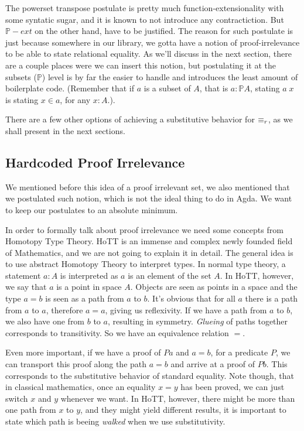 
The powerset transpose postulate is pretty much function-extensionality with some syntatic sugar, and it is
known to not introduce any contractiction. But $ℙ-ext$ on the other hand, have to be justified.
The reason for such postulate is just because somewhere in our library, we gotta have a notion
of proof-irrelevance to be able to state relational equality. As we'll discuss in the next section,
there are a couple places were we can insert this notion, but postulating it at the subsets ($ℙ$) level is
by far the easier to handle and introduces the least amount of boilerplate code. (Remember that
if $a$ is a subset of $A$, that is $a : ℙ A$, stating $a\;x$ is stating $x \in a$, for any $x : A$.).

There are a few other options of achieving a substitutive behavior for $\equiv_r$,  
as we shall present in the next sections.

\subsection{Hardcoded Proof Irrelevance}

  We mentioned before this idea of a proof irrelevant set, we also mentioned that we postulated
  such notion, which is not the ideal thing to do in Agda. We want to keep our postulates to an
  absolute minimum.
  
  In order to formally talk about proof irrelevance we need some concepts from Homotopy Type Theory\cite{hottbook}.
  HoTT is an immense and complex newly founded field of Mathematics, and we are not going to explain
  it in detail. The general idea is to use abstract Homotopy Theory to interpret types. In normal
  type theory, a statement $a : A$ is interpreted as $a$ is an element of the set $A$. In HoTT, however,
  we say that $a$ is a point in space $A$. Objects are seen as points in a space and the type $a = b$ is seen as a path from $a$ to $b$.
  It's obvious that for all $a$ there is a path from $a$ to $a$, therefore $a = a$, giving us reflexivity.
  If we have a path from $a$ to $b$, we also have one from $b$ to $a$, resulting in symmetry.
  \emph{Glueing} of paths together corresponds to transitivity. So we have an equivalence relation $=$.
  
  Even more important, if we have a proof of $P a$ and $a = b$, for a predicate $P$, we can
  transport this proof along the path $a = b$ and arrive at a proof of $P b$. This corresponds to
  the substitutive behavior of standard equality. Note though, that in classical mathematics,
  once an equality $x = y$ has been proved, we can just switch $x$ and $y$ whenever we want. 
  In HoTT, however, there might be more than one path from $x$ to $y$, and they might yield different
  results, it is important to state which path is beeing \emph{walked} when we use substitutivity.
  
